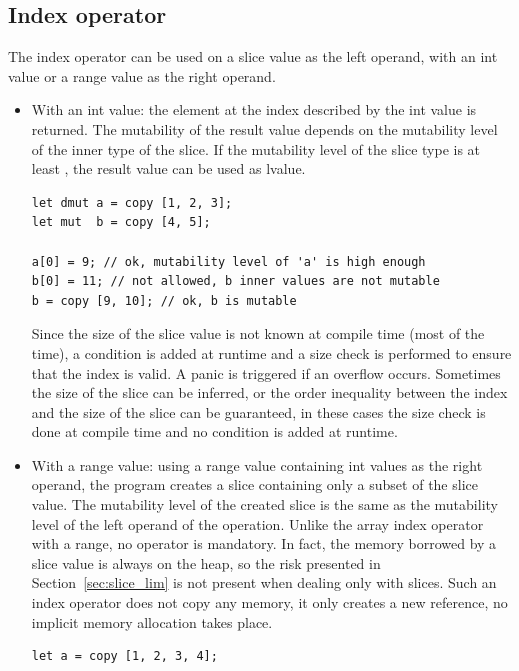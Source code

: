 \subsection{Index operator}

The index operator can be used on a slice value as the left operand, with an int
value or a range value as the right operand.

\begin{itemize}
  \setlength\itemsep{-4pt}
\item With an int value: the element at the index described by the int value is
  returned. The mutability of the result value depends on the mutability level
  of the inner type of the slice. If the mutability level of the slice type is
  at least , the result value can be used as lvalue.

  \begin{lstlisting}[style=coloredverbatimError]
let dmut a = copy [1, 2, 3];
let mut  b = copy [4, 5];

a[0] = 9; // ok, mutability level of 'a' is high enough
b[0] = 11; // not allowed, b inner values are not mutable
b = copy [9, 10]; // ok, b is mutable
  \end{lstlisting}

  Since the size of the slice value is not known at compile time (most of the
  time), a condition is added at runtime and a size check is performed to ensure
  that the index is valid. A panic is triggered if an overflow occurs. Sometimes
  the size of the slice can be inferred, or the order inequality between the
  index and the size of the slice can be guaranteed, in these cases the size
  check is done at compile time and no condition is added at runtime.

\item With a range value: using a range value containing int values as the right
  operand, the program creates a slice containing only a subset of the slice
  value. The mutability level of the created slice is the same as the mutability
  level of the left operand of the operation. Unlike the array index operator
  with a range, no  operator is mandatory. In fact, the memory
  borrowed by a slice value is always on the heap, so the risk presented in
  Section~\ref{sec:slice_lim} is not present when dealing only with slices. Such
  an index operator does not copy any memory, it only creates a new reference,
  no implicit memory allocation takes place.

  \begin{lstlisting}[style=coloredverbatim]
let a = copy [1, 2, 3, 4];


\end{lstlisting}
\end{itemize}
